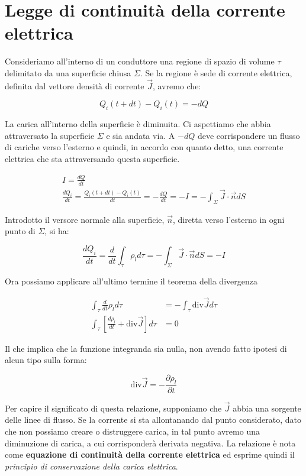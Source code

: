 \section{Legge di continuità della corrente elettrica}

Consideriamo all'interno di un conduttore una regione di spazio di volume $ \tau  $ delimitato da una superficie chiusa $\Sigma$. Se la regione è sede di corrente elettrica, definita dal vettore densità di corrente $\vec{J}$, avremo che:

\[
	Q_i(t+dt) - Q_i(t)=-dQ
\]

La carica all'interno della superficie è diminuita. Ci aspettiamo che abbia attraversato la superficie $\Sigma$ e sia andata via. A $-dQ$ deve corrispondere un flusso di cariche verso l'esterno e quindi, in accordo con quanto detto, una corrente elettrica che sta attraversando questa superficie.

\begin{gather*}
	I=\frac{dQ}{dt} \\
	\frac{dQ_i}{dt}=\frac{Q_i(t+dt)-Q_i(t)}{dt} = -\frac{dQ}{dt} = -I = -\int_{\Sigma}\vec{J} \cdot \vec{n} dS
\end{gather*}

Introdotto il versore normale alla superficie, $\vec{n}$, diretta verso l'esterno in ogni punto di $\Sigma$, si ha:

\[
	\frac{dQ_i}{dt} = \frac{d}{dt} \int_{\tau}\rho_ld\tau = -\int_{\Sigma}\vec{J} \cdot \vec{n} dS = -I
\]

Ora possiamo applicare all'ultimo termine il teorema della divergenza

\begin{align*}
	\int_{\tau}\frac{d}{dt}\rho_ld\tau &= -\int_{\tau}\text{div}\vec{J} d\tau \\
	\int_{\tau}\left[ \frac{d\rho_l}{dt}+\text{div}\vec{J}  \right] d\tau &= 0
\end{align*}

Il che implica che la funzione integranda sia nulla, non avendo fatto ipotesi di alcun tipo sulla forma:

\[
	\boxed{\text{div}\vec{J} = - \frac{\partial \rho_l}{\partial t}}
\]

Per capire il significato di questa relazione, supponiamo che $\vec{J}$ abbia una sorgente delle linee di flusso. Se la corrente si sta allontanando dal punto considerato, dato che non possiamo creare o distruggere carica, in tal punto avremo una diminuzione di carica, a cui corrisponderà derivata negativa. La relazione è nota come \textbf{equazione di continuità della corrente elettrica} ed esprime quindi il \emph{principio di conservazione della carica elettrica}.

